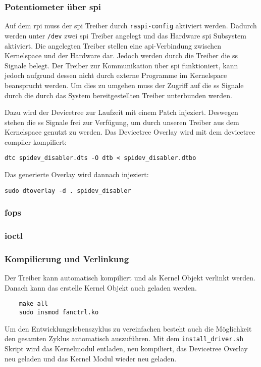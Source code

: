 \subsubsection{Potentiometer über \acrshort{spi}}



Auf dem \gls{rpi} muss der \gls{spi} Treiber durch \texttt{raspi-config} aktiviert werden.
Dadurch werden unter \texttt{/dev} zwei \gls{spi} Treiber angelegt und das Hardware \gls{spi} Subsystem aktiviert.
Die angelegten Treiber stellen eine \gls{api}-Verbindung zwischen Kernelspace und der Hardware dar.
Jedoch werden durch die Treiber die \gls{ss} Signale belegt.
Der Treiber zur Kommunikation über \gls{spi} funktioniert, kann jedoch aufgrund dessen nicht durch externe Programme im Kernelspace beansprucht werden.
Um dies zu umgehen muss der Zugriff auf die \gls{ss} Signale durch die durch das System bereitgestellten Treiber unterbunden werden.

Dazu wird der Devicetree zur Laufzeit mit einem Patch injeziert.
Deswegen stehen die \gls{ss} Signale frei zur Verfügung, um durch unseren Treiber aus dem Kernelspace genutzt zu werden.
Das Devicetree Overlay wird mit dem devicetree compiler kompiliert:
\begin{lstlisting}
dtc spidev_disabler.dts -O dtb < spidev_disabler.dtbo
\end{lstlisting}
Das generierte Overlay wird dannach injeziert:
\begin{lstlisting}
sudo dtoverlay -d . spidev_disabler
\end{lstlisting}

\subsubsection{\acrshort{fops}}

\subsubsection{\Acrshort{ioctl}}

\subsubsection{Kompilierung und Verlinkung}

Der Treiber kann automatisch kompiliert und als Kernel Objekt verlinkt werden.
Danach kann das erstelle Kernel Objekt auch geladen werden.
\begin{lstlisting}
    make all
    sudo insmod fanctrl.ko
\end{lstlisting}

Um den Entwicklungslebenszyklus zu vereinfachen besteht auch die Möglichkeit den gesamten Zyklus automatisch auszuführen.
Mit dem \texttt{install\_driver.sh} Skript wird das Kernelmodul entladen, neu kompiliert, das Devicetree Overlay neu geladen und das Kernel Modul wieder neu geladen.
